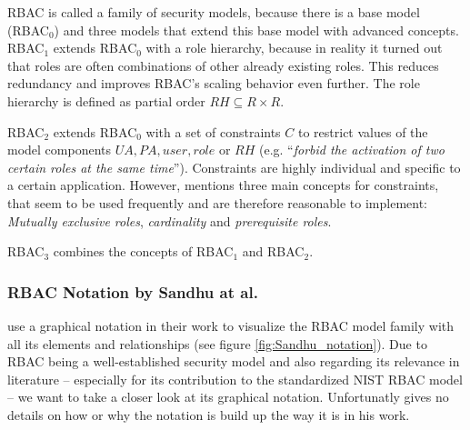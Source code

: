 \documentclass[twoside, openright, 12pt]{book}
\begin{document}
\noindent
RBAC is called a family of security models, because there is a base model (RBAC$_0$) and three models that extend this base model with advanced concepts.
RBAC$_1$ extends RBAC$_0$ with a role hierarchy, because in reality it turned out that roles are often combinations of other already existing roles.
This reduces redundancy and improves RBAC's scaling behavior even further.
The role hierarchy is defined as partial order $RH \subseteq R \times R$.%

RBAC$_2$ extends RBAC$_0$ with a set of constraints $C$ to restrict values of the model components $UA, PA, user, role$ or $RH$ (e.g. ``\textit{forbid the activation of two certain roles at the same time}'').
Constraints are highly individual and specific to a certain application.
However, \cite{Sandhu96} mentions three main concepts for constraints, that seem to be used frequently and are therefore reasonable to implement: \textit{Mutually exclusive roles}, \textit{cardinality} and \textit{prerequisite roles}.

RBAC$_3$ combines the concepts of RBAC$_1$ and RBAC$_2$.





\subsubsection{RBAC Notation by Sandhu at al.}
\label{RBAC_notation}
\cite{Sandhu96} use a graphical notation in their work to visualize the RBAC model family with all its elements and relationships (see figure \ref{fig:Sandhu_notation}).
Due to RBAC being a well-established security model and also regarding its relevance in literature -- especially for its contribution to the standardized NIST RBAC model \citep{RBACNIST} -- we want to take a closer look at its graphical notation.
Unfortunatly \cite{Sandhu96} gives no details on how or why the notation is build up the way it is in his work.
\end{document}
